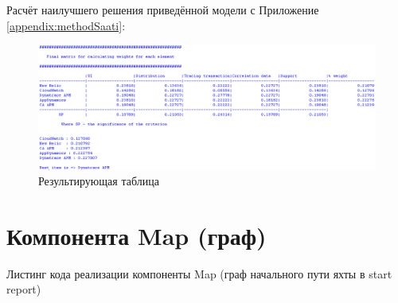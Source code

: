 Расчёт наилучшего решения приведённой модели с Приложение \ref{appendix:methodSaati}:

\begin{figure}
	\centering
	\includegraphics[width=1\linewidth]{my_folder/images/FMatrixMonitoringSys}
	\caption{Результирующая таблица}
	\label{fig:FMatrixMonitoringSys}
\end{figure}


\chapter{Компонента Map (граф)}
\label{appendix:RGTMapGraph}

Листинг кода реализации компоненты Map (граф начального пути яхты в start report)

